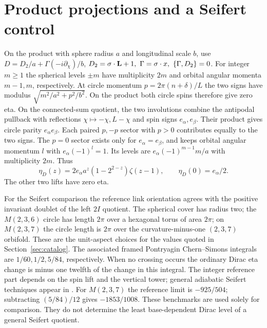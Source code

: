 \section{Product projections and a Seifert control}\label{app:product}
On the product with sphere radius \(a\) and longitudinal scale \(b\), use
\(D=D_2/a+\Gamma(-i\partial_\chi)/b\),
\(D_2=\sigma\cdot{\bf L}+1,\ \Gamma=\sigma\cdot x,\ \{\Gamma,D_2\}=0\).
For integer \(m\ge1\) the spherical levels \(\pm m\) have multiplicity \(2m\) and orbital angular momenta \(m-1,m\), respectively. At circle momentum \(p=2\pi(n+\delta)/L\) the two signs have modulus \(\sqrt{m^2/a^2+p^2/b^2}\). On the product both circle spins therefore give zero eta. On the connected-sum quotient, the two involutions combine the antipodal pullback with reflections \(\chi\mapsto-\chi,L-\chi\) and spin signs \(e_\alpha,e_\beta\). Their product gives circle parity \(e_\alpha e_\beta\). Each paired \(p,-p\) sector with \(p>0\) contributes equally to the two signs. The \(p=0\) sector exists only for \(e_\alpha=e_\beta\), and keeps orbital angular momentum \(l\) with \(e_\alpha(-1)^l=1\). Its levels are \(e_\alpha(-1)^{m-1}m/a\) with multiplicity \(2m\). Thus
\[
 \eta_D(z)=2e_\alpha a^z(1-2^{2-z})\zeta(z-1),\qquad \eta_D(0)=e_\alpha/2.
\]
The other two lifts have zero eta.

For the Seifert comparison the reference link orientation agrees with the positive invariant doublet of the left \(2I\) quotient. The spherical cover has radius two; the \(M(2,3,6)\) circle has length \(2\pi\) over a hexagonal torus of area \(2\pi\); on \(M(2,3,7)\) the circle length is \(2\pi\) over the curvature-minus-one \((2,3,7)\) orbifold. These are the unit-aspect choices for the values quoted in Section~\ref{sec:catalog}. The associated framed Pontryagin Chern--Simons integrals are \(1/60,1/2,5/84\), respectively. When no crossing occurs the ordinary Dirac eta change is minus one twelfth of the change in this integral. The integer reference part depends on the spin lift and the vertical tower; general adiabatic Seifert techniques appear in \cite{nicolaescu}. For \(M(2,3,7)\) the reference limit is \(-925/504\); subtracting \( (5/84)/12\) gives \(-1853/1008\). These benchmarks are used solely for comparison. They do not determine the least base-dependent Dirac level of a general Seifert quotient.
